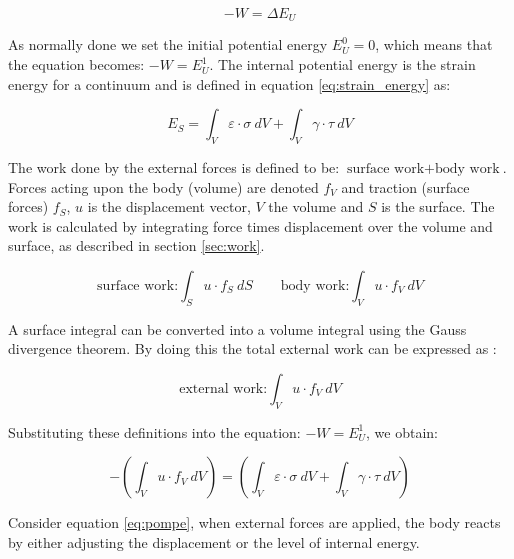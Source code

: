 \begin{equation*}
- W = \Delta E_U
\end{equation*}

As normally done we set the initial potential energy $E_U^0 = 0$,
which means that the equation becomes: $- W = E_U^1$. The internal
potential energy is the strain energy for a continuum and is defined
in equation \eqref{eq:strain_energy} as:

\begin{equation*}
  E_S = \int_{V} \varepsilon \cdot \sigma \ dV +
  \int_{V} \gamma \cdot \tau \ dV
\end{equation*}

The work done by the external forces is defined to be:
$\mbox{surface work} + \mbox{body work}$.
Forces acting upon the body (volume) are denoted $f_V$ and traction
(surface forces) $f_S$, $u$ is the displacement vector, $V$ the volume
and $S$ is the surface. The work is calculated by integrating force times
displacement over the volume and surface, as described in section
\vref{sec:work}.

\begin{equation}
  \mbox{surface work:} \int_{S} u \cdot f_S \ dS
  \qquad
  \mbox{body work:} \int_{V} u \cdot f_V \ dV 
\end{equation}

A surface integral can be converted into a volume integral
using the Gauss divergence theorem. By doing this the total external
work can be expressed as
:

\begin{equation}
  \label{eq:external-work}
  \mbox{external work:}
  \int_{V} u \cdot f_V \ dV
\end{equation}

Substituting these definitions into the equation: $ -W= E_U^1$, we obtain:

\begin{equation}
  \label{eq:pompe}
  - ( \int_{V} u \cdot f_V \ dV ) =
  ( \int_{V} \varepsilon \cdot \sigma \ dV +
  \int_{V} \gamma \cdot \tau \ dV )
\end{equation}

Consider equation \eqref{eq:pompe}, when external forces are applied,
the body reacts by either adjusting the displacement or the level of
internal energy.

